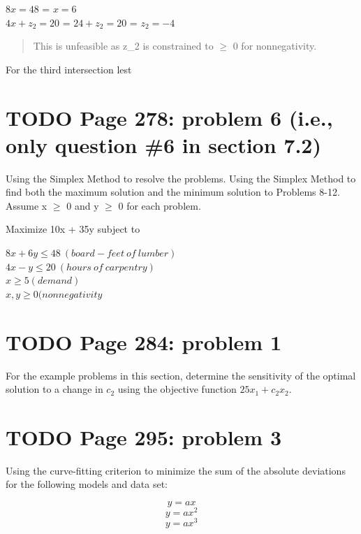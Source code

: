 \documentclass[]{article}
\begin{document}
\(8x = 48\) = \(x = 6\)\\
\(4x + z_2 = 20\) = \(24 + z _2 = 20\) = \(z_2 = -4\)

\begin{quote}
This is unfeasible as z\_2 is constrained to \(\geq\) 0 for
nonnegativity.
\end{quote}

For the third intersection lest

\section{TODO Page 278: problem 6 (i.e., only question \#6 in section
7.2)}\label{todo-page-278-problem-6-i.e.-only-question-6-in-section-7.2}

Using the Simplex Method to resolve the problems. Using the Simplex
Method to find both the maximum solution and the minimum solution to
Problems 8-12. Assume x \(\geq\) 0 and y \(\geq\) 0 for each problem.

Maximize 10x + 35y subject to

\(8x + 6y \leq 48 ~(board-feet~of~lumber)\)\\
\(4x - y \leq 20 ~ (hours~of~carpentry)\)\\
\(x \geq 5 (demand)\)\\
\(x,y \geq 0 (nonnegativity\)

\section{TODO Page 284: problem 1}\label{todo-page-284-problem-1}

For the example problems in this section, determine the sensitivity of
the optimal solution to a change in \(c_2\) using the objective function
\(25x_1 + c_2x_2\).

\section{TODO Page 295: problem 3}\label{todo-page-295-problem-3}

Using the curve-fitting criterion to minimize the sum of the absolute
deviations for the following models and data set:

\[y = ax\] \[y = ax^2\] \[y = ax^3\]
\end{document}
